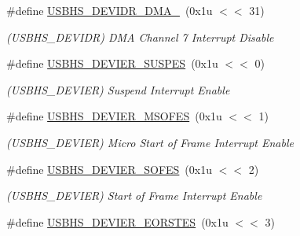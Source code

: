 \begin{DoxyCompactItemize}
\mbox{\label{group__SAMV71__USBHS_ga47114c490f9c49872eaec366836ae82a}} 
\#define \mbox{\hyperlink{group__SAMV71__USBHS_ga47114c490f9c49872eaec366836ae82a}{U\+S\+B\+H\+S\+\_\+\+D\+E\+V\+I\+D\+R\+\_\+\+D\+M\+A\+\_}}~(0x1u $<$$<$ 31)
\begin{DoxyCompactList}\small\item\em (U\+S\+B\+H\+S\+\_\+\+D\+E\+V\+I\+DR) D\+MA Channel 7 Interrupt Disable \end{DoxyCompactList}\item 
\mbox{\label{group__SAMV71__USBHS_ga5ad81ac99d74f1231b972e9750d6cb4a}} 
\#define \mbox{\hyperlink{group__SAMV71__USBHS_ga5ad81ac99d74f1231b972e9750d6cb4a}{U\+S\+B\+H\+S\+\_\+\+D\+E\+V\+I\+E\+R\+\_\+\+S\+U\+S\+P\+ES}}~(0x1u $<$$<$ 0)
\begin{DoxyCompactList}\small\item\em (U\+S\+B\+H\+S\+\_\+\+D\+E\+V\+I\+ER) Suspend Interrupt Enable \end{DoxyCompactList}\item 
\mbox{\label{group__SAMV71__USBHS_ga225a9e428f65224fb3d621a95dcd4b83}} 
\#define \mbox{\hyperlink{group__SAMV71__USBHS_ga225a9e428f65224fb3d621a95dcd4b83}{U\+S\+B\+H\+S\+\_\+\+D\+E\+V\+I\+E\+R\+\_\+\+M\+S\+O\+F\+ES}}~(0x1u $<$$<$ 1)
\begin{DoxyCompactList}\small\item\em (U\+S\+B\+H\+S\+\_\+\+D\+E\+V\+I\+ER) Micro Start of Frame Interrupt Enable \end{DoxyCompactList}\item 
\mbox{\label{group__SAMV71__USBHS_ga7de30665df3c266939e6d925de57990a}} 
\#define \mbox{\hyperlink{group__SAMV71__USBHS_ga7de30665df3c266939e6d925de57990a}{U\+S\+B\+H\+S\+\_\+\+D\+E\+V\+I\+E\+R\+\_\+\+S\+O\+F\+ES}}~(0x1u $<$$<$ 2)
\begin{DoxyCompactList}\small\item\em (U\+S\+B\+H\+S\+\_\+\+D\+E\+V\+I\+ER) Start of Frame Interrupt Enable \end{DoxyCompactList}\item 
\mbox{\label{group__SAMV71__USBHS_gafca5592f127b2370fa403d94589ccc00}} 
\#define \mbox{\hyperlink{group__SAMV71__USBHS_gafca5592f127b2370fa403d94589ccc00}{U\+S\+B\+H\+S\+\_\+\+D\+E\+V\+I\+E\+R\+\_\+\+E\+O\+R\+S\+T\+ES}}~(0x1u $<$$<$ 3)
$$
\end{DoxyCompactItemize}
